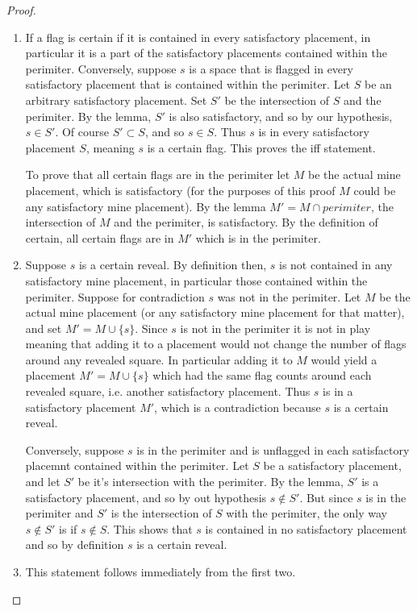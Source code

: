 \documentclass{article}
\theoremstyle{definition}
\theoremstyle{definition}
\theoremstyle{theorem}
\begin{document}
	\begin{proof}
	\begin{enumerate}
		\item
		If a flag is certain if it is contained in every satisfactory placement, in particular it is a part of the satisfactory placements contained within the perimiter. Conversely, suppose $s$ is a space that is flagged in every satisfactory placement that is contained within the perimiter. Let $S$ be an arbitrary satisfactory placement. Set $S'$ be the intersection of $S$ and the perimiter. By the lemma, $S'$ is also satisfactory, and so by our hypothesis,  $s \in S'$. Of course $S' \subset S$, and so $s \in S$. Thus $s$ is in every satisfactory placement $S$, meaning $s$ is a certain flag. This proves the iff statement. 
		
		To prove that all certain flags are in the perimiter let $M$ be the actual mine placement, which is satisfactory (for the purposes of this proof $M$ could be any satisfactory mine placement). By the lemma $M' = M \cap perimiter$, the intersection of $M$ and the perimiter, is satisfactory. By the definition of certain, all certain flags are in $M'$ which is  in the perimiter.
		
		\item
		Suppose $s$ is a certain reveal. By definition then, $s$ is not contained in any satisfactory mine placement, in particular those contained within the perimiter. Suppose for contradiction $s$ was not in the perimiter. Let $M$ be the actual mine placement (or any satisfactory mine placement for that matter), and set $M' = M \cup \{s\}$. Since $s$ is not in the perimiter it is not in play meaning that adding it to a placement would not change the number of flags around any revealed square. In particular adding it to $M$ would yield a placement $M' = M \cup \{s\}$ which had the same flag counts around each revealed square, i.e. another satisfactory placement. Thus $s$ is in a satisfactory placement $M'$, which is a contradiction because $s$ is a certain reveal.
		
		Conversely, suppose $s$ is in the perimiter and is unflagged in each satisfactory placemnt contained within the perimiter. Let $S$ be a satisfactory placement, and let $S'$ be it's intersection with the perimiter. By the lemma, $S'$ is a satisfactory placement, and so by out hypothesis $s \notin S'$. But since  $s$ is in the perimiter and $S'$ is the intersection of $S$ with the perimiter, the only way $s \notin S'$ is if $s \notin S$. This shows that $s$ is contained in no satisfactory placement and so by definition $s$ is a certain reveal.
		
		\item
		This statement follows immediately from the first two.
		
		
	\end{enumerate}
	\end{proof}
\end{document}
